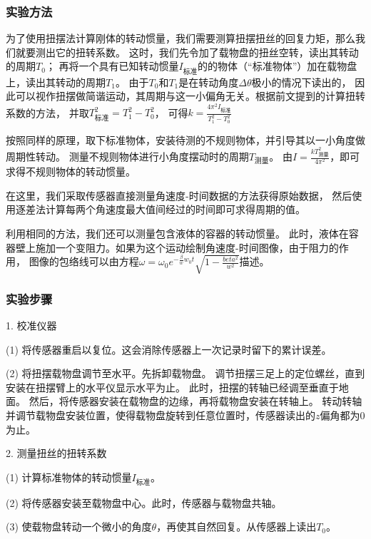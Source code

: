 \documentclass[12pt,hyperref,a4paper,UTF8]{ctexart}
\begin{document}
\subsubsection{实验方法}

为了使用扭摆法计算刚体的转动惯量，我们需要测算扭摆扭丝的回复力矩，那么我们就要测出它的扭转系数。
这时，我们先令加了载物盘的扭丝空转，读出其转动的周期$ T_0 $；
再将一个具有已知转动惯量$ I_{\text{标准}} $的的物体（“标准物体”）加在载物盘上，读出其转动的周期$ T_1 $。
由于$ T_0 $和$ T_1 $是在转动角度$ \Delta \theta $极小的情况下读出的，
因此可以视作扭摆做简谐运动，其周期与这一小偏角无关。根据前文提到的计算扭转系数的方法，
并取$ T_{\text{标准}}^2 = T_1^2 - T_0^2 $，
可得$ k = \frac{4\pi^2 I_{\text{标准}}}{T_1^2 - T_0^2} $

按照同样的原理，取下标准物体，安装待测的不规则物体，并引导其以一小角度做周期性转动。
测量不规则物体进行小角度摆动时的周期$ T_{\text{测量}} $。
由$ I = \frac{k T_{\text{测量}}^2}{4\pi^2} $，即可求得不规则物体的转动惯量。

在这里，我们采取传感器直接测量角速度-时间数据的方法获得原始数据，
然后使用逐差法计算每两个角速度最大值间经过的时间即可求得周期的值。

利用相同的方法，我们还可以测量包含液体的容器的转动惯量。
此时，液体在容器壁上施加一个变阻力。如果为这个运动绘制角速度-时间图像，由于阻力的作用，
图像的包络线可以由方程$ \omega = \omega_0 e^{- \frac{\beta}{w} w_0 t} \sqrt{1 - \frac{beta^2}{w^2}} $描述。\cite{1}

\subsubsection{实验步骤}

1. 校准仪器

(1) 将传感器重启以复位。这会消除传感器上一次记录时留下的累计误差。

(2) 将扭摆载物盘调节至水平。先拆卸载物盘。
调节扭摆三足上的定位螺丝，直到安装在扭摆臂上的水平仪显示水平为止。
此时，扭摆的转轴已经调至垂直于地面。
然后，将传感器安装在载物盘的边缘，再将载物盘安装在转轴上。
转动转轴并调节载物盘安装位置，使得载物盘旋转到任意位置时，传感器读出的$ z $偏角都为0为止。

2. 测量扭丝的扭转系数

(1) 计算标准物体的转动惯量$ I_{\text{标准}} $。

(2) 将传感器安装至载物盘中心。此时，传感器与载物盘共轴。

(3) 使载物盘转动一个微小的角度$ \theta $，再使其自然回复。从传感器上读出$ T_0 $。
\end{document}
